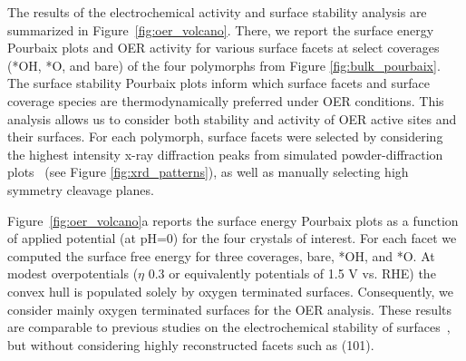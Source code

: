 %
%
The results of the electrochemical activity and surface stability analysis are summarized in Figure~\ref{fig:oer_volcano}.
%
There, we report the surface energy Pourbaix plots and OER activity for various surface facets at select coverages (*OH, *O, and bare) of the four \IrOx polymorphs from Figure \ref{fig:bulk_pourbaix}.
%
The surface stability Pourbaix plots inform which surface facets and surface coverage species are thermodynamically preferred under OER conditions.
%
This analysis allows us to consider both stability and activity of OER active sites and their surfaces.
%
For each polymorph, surface facets were selected by considering the highest intensity x-ray diffraction peaks from simulated powder-diffraction plots~\cite{Momma2011} (see Figure \ref{fig:xrd_patterns}),
as well as manually selecting high symmetry cleavage planes.


%
%
Figure~\ref{fig:oer_volcano}a reports the surface energy Pourbaix plots as a function of applied potential (at pH\num{=0}) for the four \IrOx crystals of interest.
%
For each facet we computed the surface free energy for three coverages, bare, *OH, and *O.
%
At modest overpotentials ($\eta$ \mytilde\num{0.3} or equivalently potentials of \mytilde\num{1.5} V vs. RHE) the convex hull is populated solely by oxygen terminated surfaces.
%
Consequently, we consider mainly oxygen terminated surfaces for the OER analysis.
%
These results are comparable to previous studies on the electrochemical stability of \IrOtwo surfaces~\cite{Nattino2019},
but without considering highly reconstructed facets such as (101).


